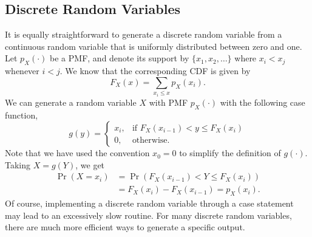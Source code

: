 \subsection{Discrete Random Variables}

It is equally straightforward to generate a discrete random variable from a continuous random variable that is uniformly distributed between zero and one.
Let $p_X(\cdot)$ be a PMF, and denote its support by $\{ x_1, x_2, \ldots \}$ where $x_i < x_j$ whenever $i < j$.
We know that the corresponding CDF is given by
\begin{equation*}
F_X(x) = \sum_{x_i \leq x} p_X (x_i) .
\end{equation*}
We can generate a random variable $X$ with PMF $p_X(\cdot)$ with the following case function,
\begin{equation*}
g(y) = \begin{cases} x_i, & \text{if } F_X(x_{i-1}) < y \leq F_X (x_i) \\
0, & \text{otherwise}. \end{cases}
\end{equation*}
Note that we have used the convention $x_0 = 0$ to simplify the definition of $g(\cdot)$.
Taking $X = g(Y)$, we get
\begin{equation*}
\begin{split}
\Pr (X = x_i) &= \Pr ( F_X(x_{i-1}) < Y \leq F_X (x_i) ) \\
&= F_X (x_i) - F_X (x_{i-1}) = p_X (x_i) .
\end{split}
\end{equation*}
Of course, implementing a discrete random variable through a case statement may lead to an excessively slow routine.
For many discrete random variables, there are much more efficient ways to generate a specific output.




